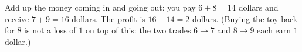 Add up the money coming in and going out: you pay $6+8=14$ dollars and receive $7+9=16$ dollars. The profit is $16-14=\boxed{2}$ dollars. (Buying the toy back for $8$ is not a loss of $1$ on top of this: the two trades $6\to7$ and $8\to9$ each earn $1$ dollar.)
